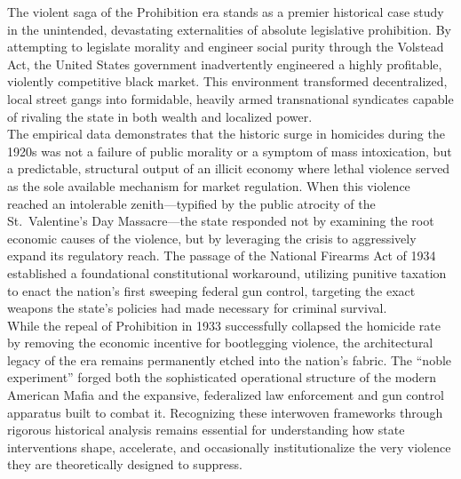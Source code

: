 \documentclass[
]{article}
\newcounter{none} %
\begin{document}
The violent saga of the Prohibition era stands as a premier historical
case study in the unintended, devastating externalities of absolute
legislative prohibition. By attempting to legislate morality and
engineer social purity through the Volstead Act, the United States
government inadvertently engineered a highly profitable, violently
competitive black market. This environment transformed decentralized,
local street gangs into formidable, heavily armed transnational
syndicates capable of rivaling the state in both wealth and localized
power.\\
The empirical data demonstrates that the historic surge in homicides
during the 1920s was not a failure of public morality or a symptom of
mass intoxication, but a predictable, structural output of an illicit
economy where lethal violence served as the sole available mechanism for
market regulation. When this violence reached an intolerable
zenith---typified by the public atrocity of the St.~Valentine's Day
Massacre---the state responded not by examining the root economic causes
of the violence, but by leveraging the crisis to aggressively expand its
regulatory reach. The passage of the National Firearms Act of 1934
established a foundational constitutional workaround, utilizing punitive
taxation to enact the nation's first sweeping federal gun control,
targeting the exact weapons the state's policies had made necessary for
criminal survival.\\
While the repeal of Prohibition in 1933 successfully collapsed the
homicide rate by removing the economic incentive for bootlegging
violence, the architectural legacy of the era remains permanently etched
into the nation's fabric. The ``noble experiment'' forged both the
sophisticated operational structure of the modern American Mafia and the
expansive, federalized law enforcement and gun control apparatus built
to combat it. Recognizing these interwoven frameworks through rigorous
historical analysis remains essential for understanding how state
interventions shape, accelerate, and occasionally institutionalize the
very violence they are theoretically designed to suppress.

\FloatBarrier
\nocite{*}
\printbibliography[title={Works cited},sorting=none]
\label{works-cited}
\end{document}
